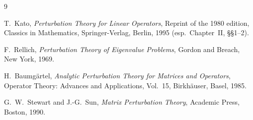 \documentclass[11pt,a4paper]{article}
\theoremstyle{definition}
\begin{document}
\begin{thebibliography}{9}

T.~Kato,
\emph{Perturbation Theory for Linear Operators},
Reprint of the 1980 edition, Classics in Mathematics, Springer-Verlag, Berlin, 1995
(esp.\ Chapter~II, \S\S1--2).

F.~Rellich,
\emph{Perturbation Theory of Eigenvalue Problems},
Gordon and Breach, New York, 1969.

H.~Baumg\"artel,
\emph{Analytic Perturbation Theory for Matrices and Operators},
Operator Theory: Advances and Applications, Vol.~15, Birkh\"auser, Basel, 1985.

G.~W.~Stewart and J.-G.~Sun,
\emph{Matrix Perturbation Theory},
Academic Press, Boston, 1990.

\end{thebibliography}
\end{document}
